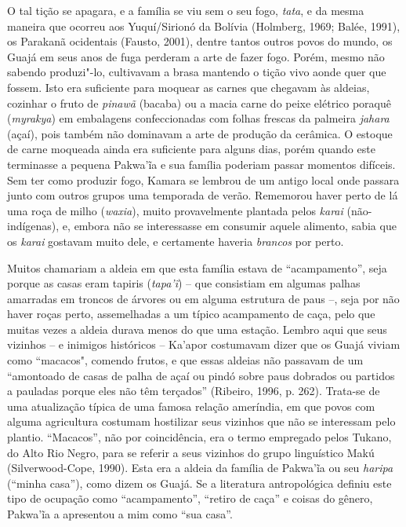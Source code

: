 O tal tição se apagara, e a família se viu sem o seu fogo,
\emph{tata}, e da mesma maneira que ocorreu aos Yuquí/Sirionó da Bolívia
(Holmberg, 1969; Balée, 1991), os Parakanã ocidentais (Fausto, 2001),
dentre tantos outros povos do mundo, os Guajá em seus anos de fuga
perderam a arte de fazer fogo. Porém, mesmo não sabendo produzi"-lo,
cultivavam a brasa mantendo o tição vivo aonde quer que fossem. Isto era
suficiente para moquear as carnes que chegavam às aldeias, cozinhar o
fruto de \emph{pinawã} (bacaba) ou a macia carne do peixe elétrico
poraquê (\emph{myrakya}) em embalagens confeccionadas com folhas frescas
da palmeira \emph{jahara} (açaí), pois também não dominavam a arte de
produção da cerâmica. O estoque de carne moqueada ainda era suficiente
para alguns dias, porém quando este terminasse a pequena Pakwa'ĩa e sua
família poderiam passar momentos difíceis. Sem ter como produzir fogo,
Kamara se lembrou de um antigo local onde passara junto com outros
grupos uma temporada de verão. Rememorou haver perto de lá uma roça de
milho (\emph{waxia}), muito provavelmente plantada pelos \emph{karai}
(não-indígenas), e, embora não se interessasse em consumir aquele
alimento, sabia que os \emph{karai} gostavam muito dele, e certamente
haveria \emph{brancos} por perto.

Muitos chamariam a aldeia em que esta família estava de ``acampamento'',
seja porque as casas eram tapiris (\emph{tapa'ĩ}) -- que consistiam em
algumas palhas amarradas em troncos de árvores ou em alguma estrutura de
paus --, seja por não haver roças perto, assemelhadas a um típico
acampamento de caça, pelo que muitas vezes a aldeia durava menos do que
uma estação. Lembro aqui que seus vizinhos -- e inimigos históricos --
Ka'apor costumavam dizer que os Guajá viviam como ``macacos", comendo
frutos, e que essas aldeias não passavam de um ``amontoado de casas de
palha de açaí ou pindó sobre paus dobrados ou partidos a pauladas porque
eles não têm terçados'' (Ribeiro, 1996, p. 262). Trata-se de uma
atualização típica de uma famosa relação ameríndia, em que povos com
alguma agricultura costumam hostilizar seus vizinhos que não se
interessam pelo plantio. ``Macacos'', não por coincidência, era o termo
empregado pelos Tukano, do Alto Rio Negro, para se referir a seus
vizinhos do grupo linguístico Makú (Silverwood-Cope, 1990). Esta era a
aldeia da família de Pakwa'ĩa ou seu \emph{haripa} (``minha casa''),
como dizem os Guajá. Se a literatura antropológica definiu este tipo de
ocupação como ``acampamento'', ``retiro de caça'' e coisas do gênero,
Pakwa'ĩa a apresentou a mim como ``sua casa''.

